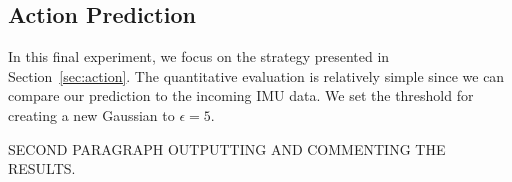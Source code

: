 \subsection{Action Prediction}
In this final experiment, we focus on the strategy presented in
Section~\ref{sec:action}. The quantitative evaluation is relatively simple since
we can compare our prediction to the incoming IMU data. We set the threshold for
creating a new Gaussian to $\epsilon=5$.

SECOND PARAGRAPH OUTPUTTING AND COMMENTING THE RESULTS.
